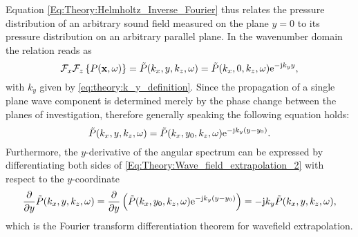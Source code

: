 Equation \eqref{Eq:Theory:Helmholtz_Inverse_Fourier} thus relates the pressure distribution of an arbitrary sound field measured on the plane $y=0$ to its pressure distribution on an arbitrary parallel plane. 
In the wavenumber domain the relation reads as
\begin{equation}
\mathcal{F}_x\mathcal{F}_z \left\{ P(\mathbf{x},\omega) \right\} = \tilde{P}(k_x,y,k_z,\omega) = \tilde{P}(k_x,0,k_z,\omega) \mathrm{e}^{-\mathrm{j} k_y y},
\label{Eq:Theory:Wave_field_extrapolation}
\end{equation}
with $k_y$ given by \eqref{eq:theory:k_y_definition}.
Since the propagation of a single plane wave component is determined merely by the phase change between the planes of investigation, therefore generally speaking the following equation holds:
\begin{equation}
\tilde{P}(k_x,y,k_z,\omega) = \tilde{P}(k_x,y_0,k_z,\omega) \mathrm{e}^{-\mathrm{j} k_y ( y - y_0 ) }.
\label{Eq:Theory:Wave_field_extrapolation_2}
\end{equation}
Furthermore, the $y$-derivative of the angular spectrum can be expressed by differentiating both sides of \eqref{Eq:Theory:Wave_field_extrapolation_2} with respect to the $y$-coordinate
\begin{equation}
\frac{\partial}{\partial y} \tilde{P}(k_x,y,k_z,\omega) = \frac{\partial}{\partial y} \left( \tilde{P}(k_x,y_0,k_z,\omega) \mathrm{e}^{-\mathrm{j} k_y ( y - y_0 ) } \right) = -\mathrm{j} k_y \tilde{P}(k_x,y,k_z,\omega),
\label{eq:Theory:Fourier_diff}
\end{equation}
which is the Fourier transform differentiation theorem for wavefield extrapolation.

